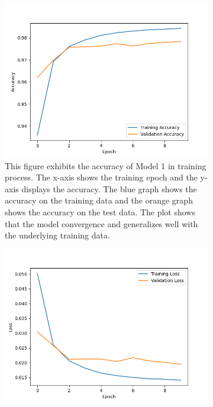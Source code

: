 \begin{figure}[ht!]  
  \centering
  \begin{subfigure}[b]{.47\textwidth}
      \centering
      \includegraphics[width=\linewidth ]{images/M1_ACC_fin.png}
      \caption{This figure exhibits the accuracy of Model 1 in training process. The x-axis shows the training epoch and the y-axis 
      displays the accuracy. The blue graph shows the accuracy on the training data and the orange graph shows the accuracy on the test data.
    The plot shows that the model convergence and generalizes well with the underlying training data. }
      \label{fig:accM1}
  \end{subfigure}
  \hfill
  \begin{subfigure}[b]{.47\textwidth}
      \centering
      \includegraphics[width=\linewidth, keepaspectratio]{images/M1_Loss_Fin.png}

\end{subfigure}
\end{figure}
